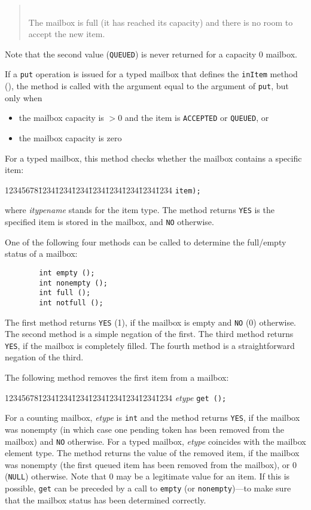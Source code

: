\begin{quote}
\noindent{}\\ \hspace{0in}
The mailbox is full (it has reached its capacity)
and there is no room to accept the new item.
\end{quote}\medskip

Note that the second value ({\tt QUEUED}) is never returned for a
capacity 0 mailbox.

If a {\tt put} operation is issued for a typed mailbox that defines the
{\tt inItem} method (), the method is called
with the argument equal to the argument of {\tt put}, but only when
\begin{itemize}
\item
the mailbox capacity is $> 0$ and
the item is {\tt ACCEPTED} or {\tt QUEUED}, or
\item
the mailbox capacity is zero
\end{itemize}

For a typed mailbox, this method checks whether the mailbox contains a specific
item:
{\tt\begin{tabbing}
12345678\=1234\=1234\=1234\=1234\=1234\=1234\=1234\=1234\kill
{} {\tt item);}
\end{tabbing}}
\noindent
where {\em itypename\/} stands for the item type.
The method returns {\tt YES} is the specified item is stored in the mailbox,
and {\tt NO} otherwise.

One of the following four methods can be called to determine the full/empty
status of a mailbox:
\begin{verbatim}
        int empty ();
        int nonempty ();
        int full ();
        int notfull ();
\end{verbatim}
The first method returns {\tt YES} (1), if the mailbox is empty and {\tt NO}
(0) otherwise.
The second method is a simple negation of the first.
The third method returns {\tt YES}, if the mailbox is completely filled.
The fourth method is a straightforward negation of the third.

The following method removes the first item from a mailbox:
{\tt\begin{tabbing}
12345678\=1234\=1234\=1234\=1234\=1234\=1234\=1234\=1234\kill
\> {\em etype\/} {\tt get (); }
\end{tabbing}}
For a counting mailbox, {\em etype\/} is {\tt int}
and the method returns {\tt YES}, if the mailbox was
nonempty (in which case one pending token has been removed from the mailbox)
and {\tt NO} otherwise.
For a typed mailbox, {\em etype} coincides with the mailbox element type.
The method returns the value of the
removed item, if the mailbox was
nonempty (the first queued item has been removed from the mailbox), or
0 ({\tt NULL}) otherwise.
Note that 0 may be a legitimate value for an item.
If this is possible,
{\tt get} can be preceded
by a call to {\tt empty} (or {\tt nonempty})---to make sure that the mailbox
status has been determined correctly.

